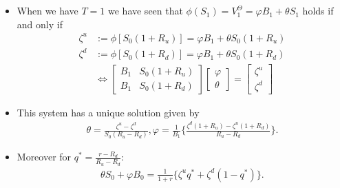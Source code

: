 \documentclass{beamer}
\numberwithin{equation}{section}
\begin{document}
\begin{frame}\frametitle{{\normalsize \secname} \\ {\large \subsecname}}
    \begin{itemize}
        \item When we have $T=1$ we have seen that $\phi(S_1) = V_1^{\Theta} = \varphi B_1 + \theta S_1$ holds if and only if 
        \begin{align*}
            \zeta^u &:= \phi [S_0(1+R_u)] = \varphi B_1 + \theta S_0(1+R_u)\\
            \zeta^d &:= \phi [S_0(1+R_d)] = \varphi B_1 + \theta S_0(1+R_d) \\
            & \Leftrightarrow \begin{bmatrix} B_1 & S_0(1 + R_u)\\ B_1 & S_0(1 + R_d)\end{bmatrix} \begin{bmatrix} \varphi \\ \theta \end{bmatrix} = \begin{bmatrix} \zeta^u\\ \zeta^d\end{bmatrix}
        \end{align*}
            \item This system has a unique solution given by
        \begin{align*}
            \theta = \frac{\zeta^u - \zeta^d}{S_0 (R_u - R_d)}, \varphi = \frac{1}{B_1} \Bigg\{ \frac{\zeta^d(1+R_u) - \zeta^u(1+R_d)}{R_u - R_d} \Bigg\}. 
        \end{align*}
        \item <2-> Moreover for $q^* = \frac{r - R_d}{R_u - R_d}$:
        \begin{align*}
            \theta S_0 + \varphi B_0 = \frac{1}{1+r} \Bigg\{ \zeta^u q^* + \zeta^d(1-q^*) \Bigg\}. 
        \end{align*}
    \end{itemize}
\end{frame}
\end{document}
